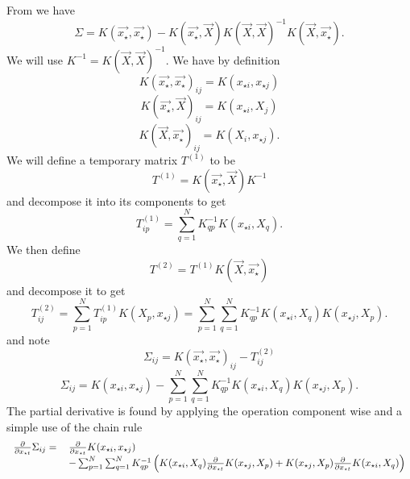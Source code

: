 \documentclass[index]{subfiles}
\begin{document}
From \cite{RW} we have
\begin{equation}
 \Sigma = K(\vec{x_{\star}}, \vec{x_{\star}}) - K(\vec{x_{\star}}, \vec{X}) K(\vec{X}, \vec{X})^{-1} K(\vec{X}, \vec{x_{\star}}).
\end{equation}
We will use $K^{-1} = K(\vec{X}, \vec{X})^{-1}$. We have by definition
\begin{equation}
 K(\vec{x_{\star}}, \vec{x_{\star}})_{ij} = K(x_{\star i}, x_{\star j})
\end{equation}
\begin{equation}
 K(\vec{x_{\star}}, \vec{X})_{ij} = K(x_{\star i}, X_{j})
\end{equation}
\begin{equation}
 K(\vec{X}, \vec{x_{\star}})_{ij} = K(X_{i}, x_{\star j}).
\end{equation}
We will define a temporary matrix $T^{(1)}$ to be
\begin{equation}
 T^{(1)} = K(\vec{x_{\star}}, \vec{X}) K^{-1}
\end{equation}
and decompose it into its components to get
\begin{equation}
 T^{(1)}_{ip} = \sum_{q = 1}^{N} K^{-1}_{qp} K(x_{\star i}, X_{q}).
\end{equation}
We then define
\begin{equation}
 T^{(2)} = T^{(1)} K(\vec{X}, \vec{x_{\star}})
\end{equation}
and decompose it to get
\begin{equation}
 T^{(2)}_{ij} = \sum_{p = 1}^{N} T^{(1)}_{ip} K(X_{p}, x_{\star j}) = \sum_{p = 1}^{N} \sum_{q = 1}^{N} K^{-1}_{qp} K(x_{\star i}, X_{q}) K(x_{\star j}, X_{p}).
\end{equation}
and note
\begin{equation}
 \Sigma_{ij} = K(\vec{x_{\star}}, \vec{x_{\star}})_{ij} - T^{(2)}_{ij}
\end{equation}
\begin{equation}
 \Sigma_{ij} = K(x_{\star i}, x_{\star j}) - \sum_{p = 1}^{N} \sum_{q = 1}^{N} K^{-1}_{qp} K(x_{\star i}, X_{q}) K(x_{\star j}, X_{p}).
\end{equation}
The partial derivative is found by applying the operation component wise and a simple use of the chain rule
\begin{equation}
 \begin{tabular}{rl}
 $\frac{\partial}{\partial x_{\star t}} \Sigma_{ij} =$ & $\frac{\partial}{\partial x_{\star t}} K(x_{\star i}, x_{\star j})$ \\
 & $- \sum_{p = 1}^{N} \sum_{q = 1}^{N} K^{-1}_{qp} \left( K(x_{\star i}, X_{q}) \frac{\partial}{\partial x_{\star t}} K(x_{\star j}, X_{p}) + K(x_{\star j}, X_{p}) \frac{\partial}{\partial x_{\star t}} K(x_{\star i}, X_{q}) \right)$
 \end{tabular}
\end{equation}
\end{document}
